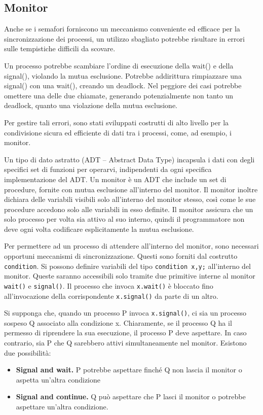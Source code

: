 \documentclass[a4paper]{article}
\begin{document}
\subsection{Monitor}
Anche se i semafori forniscono un meccanismo conveniente ed efficace per la sincronizzazione dei processi, un utilizzo sbagliato potrebbe risultare in errori sulle tempistiche difficili da scovare.

Un processo potrebbe scambiare l'ordine di esecuzione della wait() e della signal(), violando la mutua esclusione. Potrebbe addirittura rimpiazzare una signal() con una wait(), creando un deadlock. Nel peggiore dei casi potrebbe omettere una delle due chiamate, generando potenzialmente non tanto un deadlock, quanto una violazione della mutua esclusione.

Per gestire tali errori, sono stati sviluppati costrutti di alto livello per la condivisione sicura ed efficiente di dati tra i processi, come, ad esempio, i monitor.

Un tipo di dato astratto (ADT -- Abstract Data Type) incapsula i dati con degli specifici set di funzioni per operarvi, indipendenti da ogni specifica implementazione del ADT. Un monitor è un ADT che include un set di procedure, fornite con mutua esclusione all'interno del monitor. Il monitor inoltre dichiara delle variabili visibili solo all'interno del monitor stesso, così come le sue procedure accedono solo alle variabili in esso definite.\newline
Il monitor assicura che un solo processo per volta sia attivo al suo interno, quindi il programmatore non deve ogni volta codificare esplicitamente la mutua esclusione.

Per permettere ad un processo di attendere all'interno del monitor, sono necessari opportuni meccanismi di sincronizzazione. Questi sono forniti dal costrutto \texttt{condition}. Si possono definire variabili del tipo \texttt{condition x,y;} all'interno del monitor. Queste saranno accessibili solo tramite due primitive interne al monitor \texttt{wait()} e \texttt{signal()}. Il processo che invoca \texttt{x.wait()} è bloccato fino all'invocazione della corrispondente \texttt{x.signal()} da parte di un altro.

Si supponga che, quando un processo P invoca \texttt{x.signal()}, ci sia un processo sospeso Q associato alla condizione x. Chiaramente, se il processo Q ha il permesso di riprendere la sua esecuzione, il processo P deve aspettare. In caso contrario, sia P che Q sarebbero attivi simultaneamente nel monitor. Esistono due possibilità:
\begin{itemize}
    \item \textbf{Signal and wait.} P potrebbe aspettare finché Q non lascia il monitor o aspetta un'altra condizione
    \item \textbf{Signal and continue.} Q può aspettare che P lasci il monitor o potrebbe aspettare un'altra condizione.
\end{itemize}
\end{document}
